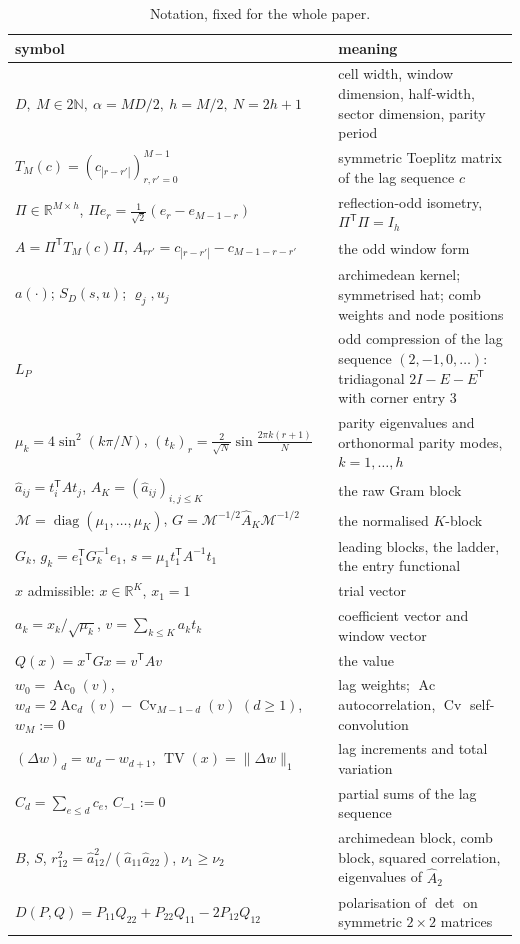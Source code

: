 \documentclass[11pt,a4paper]{article}
\theoremstyle{plain}
\theoremstyle{definition}
\newcommand{\R}{\mathbb{R}}
\newcommand{\N}{\mathbb{N}}
\newcommand{\T}{\mathsf{T}}
\newcommand{\Tm}[1]{T_{#1}}
\newcommand{\Ah}{\widehat{A}}
\newcommand{\ah}{\widehat{a}}
\newcommand{\MM}{\mathcal{M}}
\newcommand{\TV}{\operatorname{TV}}
\newcommand{\Ac}{\operatorname{Ac}}
\newcommand{\Cv}{\operatorname{Cv}}
\DeclareMathOperator{\diag}{diag}
\begin{document}
\begin{table}[t]
\centering\small
\begin{tabularx}{\textwidth}{@{}lY@{}}
\toprule
symbol & meaning \\
\midrule
$D,\ M\in2\N,\ \alpha=MD/2,\ h=M/2,\ N=2h+1$ & cell width, window dimension,
  half-width, sector dimension, parity period \\
$\Tm{M}(c)=(c_{|r-r'|})_{r,r'=0}^{M-1}$ & symmetric Toeplitz matrix of the lag
  sequence $c$ \\
$\Pi\in\R^{M\times h}$, $\Pi e_r=\tfrac1{\sqrt2}(e_r-e_{M-1-r})$ &
  reflection-odd isometry, $\Pi^{\T}\Pi=I_h$ \\
$A=\Pi^{\T}\Tm{M}(c)\Pi$, $A_{rr'}=c_{|r-r'|}-c_{M-1-r-r'}$ & the odd window
  form \\
$a(\cdot)$; $S_D(s,u)$; $\varrho_j,u_j$ & archimedean kernel; symmetrised hat;
  comb weights and node positions \\
$L_P$ & odd compression of the lag sequence $(2,-1,0,\dots)$: tridiagonal
  $2I-E-E^{\T}$ with corner entry $3$ \\
$\mu_k=4\sin^{2}(k\pi/N)$, $(t_k)_r=\tfrac2{\sqrt N}\sin\tfrac{2\pi k(r+1)}N$ &
  parity eigenvalues and orthonormal parity modes, $k=1,\dots,h$ \\
$\ah_{ij}=t_i^{\T}At_j$, $\Ah_K=(\ah_{ij})_{i,j\le K}$ & the raw Gram block \\
$\MM=\diag(\mu_1,\dots,\mu_K)$, $G=\MM^{-1/2}\Ah_K\MM^{-1/2}$ & the normalised
  $K$-block \\
$G_k$, $g_k=e_1^{\T}G_k^{-1}e_1$, $s=\mu_1t_1^{\T}A^{-1}t_1$ & leading blocks,
  the ladder, the entry functional \\
$x$ admissible: $x\in\R^{K}$, $x_1=1$ & trial vector \\
$a_k=x_k/\sqrt{\mu_k}$, $v=\sum_{k\le K}a_kt_k$ & coefficient vector and window
  vector \\
$Q(x)=x^{\T}Gx=v^{\T}Av$ & the value \\
$w_0=\Ac_0(v)$, $w_d=2\Ac_d(v)-\Cv_{M-1-d}(v)$ $(d\ge1)$, $w_M:=0$ & lag
  weights; $\Ac$ autocorrelation, $\Cv$ self-convolution \\
$(\Delta w)_d=w_d-w_{d+1}$, $\TV(x)=\lVert\Delta w\rVert_1$ & lag increments and
  total variation \\
$C_d=\sum_{e\le d}c_e$, $C_{-1}:=0$ & partial sums of the lag sequence \\
$B$, $S$, $r_{12}^{2}=\ah_{12}^{2}/(\ah_{11}\ah_{22})$, $\nu_1\ge\nu_2$ &
  archimedean block, comb block, squared correlation, eigenvalues of $\Ah_2$ \\
$D(P,Q)=P_{11}Q_{22}+P_{22}Q_{11}-2P_{12}Q_{12}$ & polarisation of $\det$ on
  symmetric $2\times2$ matrices \\
\bottomrule
\end{tabularx}
\caption{Notation, fixed for the whole paper.}
\label{tab:notation}
\end{table}
\end{document}
